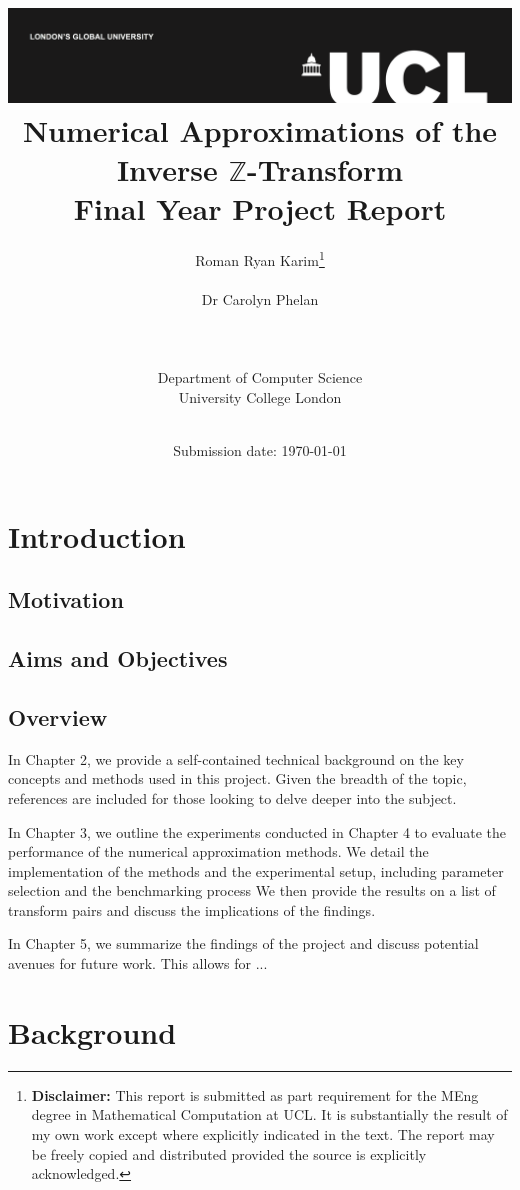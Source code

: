 \documentclass[a4paper]{report}
\title{{\vspace{-14em} \includegraphics[scale=0.4]{Logos/ucl_logo.png}}\\
{{\vspace{2em} \Huge Numerical Approximations of the Inverse $\mathbb{Z}$-Transform}}\\
{\large Final Year Project Report}\\
}
\date{Submission date: \today}
\author{Roman Ryan Karim\thanks{
{\bf Disclaimer:}
This report is submitted as part requirement for the MEng degree in Mathematical Computation at UCL. It is substantially the result of my own work except where explicitly indicated in the text. The report may be freely copied and distributed provided the source is explicitly acknowledged.}
\\ \\ Dr Carolyn Phelan
\\ \\ \\ \\ Department of Computer Science
\\ University College London
\\ \\
}
\begin{document}
 
\onehalfspacing
\maketitle
\begin{abstract}

\end{abstract}

\tableofcontents
\setcounter{page}{1}

\chapter{Introduction}
\section{Motivation}

\section{Aims and Objectives}

\section{Overview}
In Chapter 2, we provide a self-contained technical background on the key concepts and methods used in this project. Given the breadth of the topic, references are included for those looking to delve deeper into the subject. 

In Chapter 3, we outline the experiments conducted in Chapter 4 to evaluate the performance of the numerical approximation methods. We detail the implementation of the methods and the experimental setup, including parameter selection and the benchmarking process We then provide the results on a list of transform pairs and discuss the implications of the findings.

In Chapter 5, we summarize the findings of the project and discuss potential avenues for future work. This allows for ...

\chapter{Background}
\end{document}
